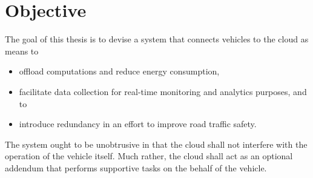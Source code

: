 \section{Objective}
The goal of this thesis is to devise a system that connects vehicles to the cloud as means to
\begin{itemize}
\item offload computations and reduce energy consumption,
\item facilitate data collection for real-time monitoring and analytics purposes, and to
\item introduce redundancy in an effort to improve road traffic safety.
\end{itemize}
The system ought to be unobtrusive in that the cloud shall not interfere with the operation of the vehicle itself. Much rather, the cloud shall act as an optional addendum that performs supportive tasks on the behalf of the vehicle. 
